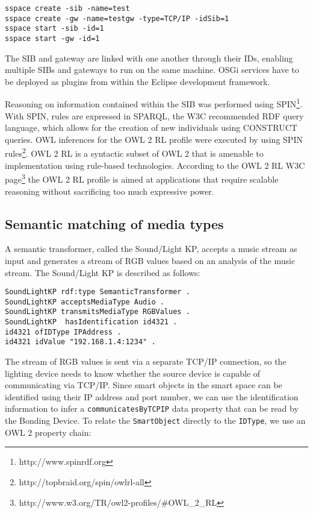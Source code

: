\begin{verbatim}
sspace create -sib -name=test
sspace create -gw -name=testgw -type=TCP/IP -idSib=1
sspace start -sib -id=1
sspace start -gw -id=1
\end{verbatim}

The \ac{SIB} and gateway are linked with one another through their IDs, enabling multiple \acp{SIB} and gateways to run on the same machine. \ac{OSGi} services have to be deployed as plugins from within the Eclipse development framework.

Reasoning on information contained within the \ac{SIB} was performed using \ac{SPIN}\footnote{http://www.spinrdf.org}. With SPIN, rules are expressed in \ac{SPARQL}, the W3C recommended \ac{RDF} query language, which allows for the creation of new individuals using CONSTRUCT queries. \ac{OWL} inferences for the \ac{OWL} 2 \ac{RL} profile were executed by using \ac{SPIN} rules\footnote{ http://topbraid.org/spin/owlrl-all}. OWL 2 RL is a syntactic subset of OWL 2 that is amenable to implementation using rule-based technologies. According to the OWL 2 RL W3C page\footnote{http://www.w3.org/TR/owl2-profiles/\#OWL\_2\_RL} the OWL 2 RL profile is aimed at applications that require scalable reasoning without sacrificing too much expressive power. 

\subsection{Semantic matching of media types}
\label{SemanticMatching}

A semantic transformer, called the Sound/Light KP, accepts a music stream as input and generates a stream of RGB values based on an analysis of the music stream. The Sound/Light KP is described as follows:

\begin{verbatim}
SoundLightKP rdf:type SemanticTransformer .
SoundLightKP acceptsMediaType Audio .
SoundLightKP transmitsMediaType RGBValues .
SoundLightKP  hasIdentification id4321 .
id4321 ofIDType IPAddress .
id4321 idValue "192.168.1.4:1234" .
\end{verbatim}

The stream of RGB values is sent via a separate TCP/IP connection, so the lighting device needs to know whether the source device is capable of communicating via TCP/IP. Since smart objects in the smart space can be identified using their IP address and port number, we can use the identification information to infer a \texttt{communicatesByTCPIP} data property that can be read by the Bonding Device. To relate the \texttt{SmartObject} directly to the \texttt{IDType}, we use an \ac{OWL} 2 property chain:


